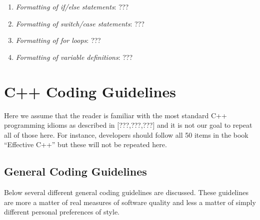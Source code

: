 \begin{enumerate}
{}\item\textit{Formatting of if/else statements}: ???

{}\item\textit{Formatting of switch/case statements}: ???

{}\item\textit{Formatting of for loops}: ???

{}\item\textit{Formatting of variable definitions}: ???

\end{enumerate}

%
\section{C++ Coding Guidelines}
%

Here we assume that the reader is familiar with the most standard C++
programming idioms as described in [???,???,???] and it is not our goal to
repeat all of those here.  For instance, developers should follow all 50 items
in the book ``Effective C++'' but these will not be repeated here.

%
\subsection{General Coding Guidelines}
%

Below several different general coding guidelines are discussed.  These
guidelines are more a matter of real measures of software quality and less a
matter of simply different personal preferences of style.

